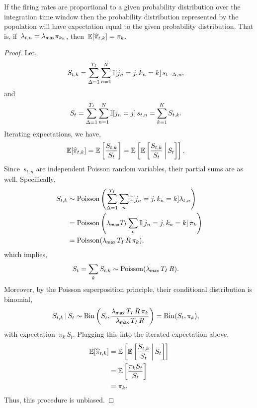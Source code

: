 \begin{lemma}
\label{lem:consistency}
If the firing rates are proportional to a given probability
distribution over the integration time window then the probability
distribution represented by the population will have expectation equal
to the given probability distribution.  That is,
if~$\lambda_{t, n}=\lambda_{\mathsf{max}} \pi_{k_n}$,
then~$\mathbb{E}[\widehat{\pi}_{t,k}] = \pi_{k}$.
\end{lemma}

\begin{proof}
  Let,
  \begin{align}
    S_{t,k} &= \sum_{\Delta = 1}^{T_I} \sum_{n=1}^N \mathbb{I}[j_n=j, k_n=k] \, s_{t-\Delta,n},
  \end{align}
  and
  \begin{align}
    S_{t} &= \sum_{\Delta = 1}^{T_I} \sum_{n=1}^N \mathbb{I}[j_n=j] \,  s_{t,n} = \sum_{k=1}^K S_{t,k}.
  \end{align}
  Iterating expectations, we have,
  \begin{align}
    \mathbb{E}[\widehat{\pi}_{t,k}] &=
    \mathbb{E} \left[ \frac{S_{t, k}}{S_{t}} \right]
    = \mathbb{E} \left[
      \mathbb{E} \left[
        \frac{S_{t,k}}{S_t} \, \bigg|\, S_{t}  
      \right] \right].
  \end{align}
  Since~$s_{t, n}$ are independent Poisson random variables, their partial
  sums are as well.  Specifically,
  \begin{align}
    S_{t,k} &\sim \mathrm{Poisson} \left( \sum_{\Delta = 1}^{T_I} \sum_{n} \mathbb{I}[j_n=j, k_n=k] \lambda_{t,n} \right) \\
    &= \mathrm{Poisson} \left(\lambda_{\mathsf{max}} T_I \sum_n \mathbb{I}[j_n=j, k_n=k] \, \pi_{k} \right) \\
    \label{eq:S_t_rate}
    &= \mathrm{Poisson}(\lambda_{\mathsf{max}} \, T_I \, R \, \pi_{k}),
  \end{align}
  which implies,
  \begin{align}
    S_{t} = \sum_{k} S_{t,k} &\sim \mathrm{Poisson}(\lambda_{\mathsf{max}} \, T_I \, R).
  \end{align}
  Moreover, by the Poisson superposition principle, their conditional
  distribution is binomial,
  \begin{align}
    S_{t,k} \,|\, S_t &\sim
    \mathrm{Bin} \left( S_t, \frac{\lambda_{\mathsf{max}} \, T_I \, R \, \pi_{k}}{\lambda_{\mathsf{max}} \, T_I \, R} \right)
    =\mathrm{Bin}(S_t, \pi_{k}),
  \end{align}
  with expectation~$\pi_{k} \, S_t$.
  Plugging this into the iterated expectation above, 
  \begin{align}
    \mathbb{E}[\widehat{\pi}_{t,k}]
    &= \mathbb{E} \left[
      \mathbb{E} \left[
        \frac{S_{t,k}}{S_t} \, \bigg|\, S_t  \right] \right] \\
    &= \mathbb{E} \left[ 
      \frac{\pi_{k} S_t}{S_t} \right]\\
    &= \pi_{k}.
  \end{align}
  Thus, this procedure is unbiased.
\end{proof}

